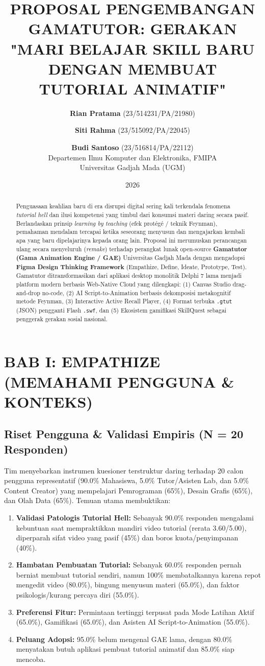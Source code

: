 \documentclass[11pt,a4paper]{article}
\title{\textbf{PROPOSAL PENGEMBANGAN GAMATUTOR: GERAKAN "MARI BELAJAR SKILL BARU DENGAN MEMBUAT TUTORIAL ANIMATIF"}}
\author{
  \textbf{Rian Pratama} (23/514231/PA/21980) \and
  \textbf{Siti Rahma} (23/515092/PA/22045) \and
  \textbf{Budi Santoso} (23/516814/PA/22112) \\
  Departemen Ilmu Komputer dan Elektronika, FMIPA \\
  Universitas Gadjah Mada (UGM)
}
\date{2026}
\begin{document}
\maketitle

\begin{abstract}
Penguasaan keahlian baru di era disrupsi digital sering kali terkendala fenomena \textit{tutorial hell} dan ilusi kompetensi yang timbul dari konsumsi materi daring secara pasif. Berlandaskan prinsip \textit{learning by teaching} (efek prot\'eg\'e / teknik Feynman), pemahaman mendalam tercapai ketika seseorang menyusun dan mengajarkan kembali apa yang baru dipelajarinya kepada orang lain. Proposal ini merumuskan perancangan ulang secara menyeluruh (\textit{remake}) terhadap perangkat lunak open-source \textbf{Gamatutor (Gama Animation Engine / GAE)} Universitas Gadjah Mada dengan mengadopsi \textbf{Figma Design Thinking Framework} (Empathize, Define, Ideate, Prototype, Test). Gamatutor ditransformasikan dari aplikasi desktop monolitik Delphi 7 lama menjadi platform modern berbasis Web-Native Cloud yang dilengkapi: (1) Canvas Studio drag-and-drop no-code, (2) AI Script-to-Animation berbasis dekomposisi metakognitif metode Feynman, (3) Interactive Active Recall Player, (4) Format terbuka \texttt{.gtut} (JSON) pengganti Flash \texttt{.swf}, dan (5) Ekosistem gamifikasi SkillQuest sebagai penggerak gerakan sosial nasional.
\end{abstract}

\section{BAB I: EMPATHIZE (MEMAHAMI PENGGUNA \& KONTEKS)}
\subsection{Riset Pengguna \& Validasi Empiris (N = 20 Responden)}
Tim menyebarkan instrumen kuesioner terstruktur daring terhadap 20 calon pengguna representatif (90.0\% Mahasiswa, 5.0\% Tutor/Asisten Lab, dan 5.0\% Content Creator) yang mempelajari Pemrograman (65\%), Desain Grafis (65\%), dan Olah Data (65\%). Temuan utama membuktikan:
\begin{enumerate}
  \item \textbf{Validasi Patologis Tutorial Hell:} Sebanyak 90.0\% responden mengalami kebuntuan saat mempraktikkan mandiri video tutorial (rerata 3.60/5.00), diperparah sifat video yang pasif (45\%) dan boros kuota/penyimpanan (40\%).
  \item \textbf{Hambatan Pembuatan Tutorial:} Sebanyak 60.0\% responden pernah berniat membuat tutorial sendiri, namun 100\% membatalkannya karena repot mengedit video (80.0\%), bingung menyusun materi (65.0\%), dan faktor psikologis/kurang percaya diri (55.0\%).
  \item \textbf{Preferensi Fitur:} Permintaan tertinggi terpusat pada Mode Latihan Aktif (65.0\%), Gamifikasi (65.0\%), dan Asisten AI Script-to-Animation (55.0\%).
  \item \textbf{Peluang Adopsi:} 95.0\% belum mengenal GAE lama, dengan 80.0\% menyatakan butuh aplikasi pembuat tutorial animatif dan 85.0\% siap mencoba.
\end{enumerate}
\end{document}
